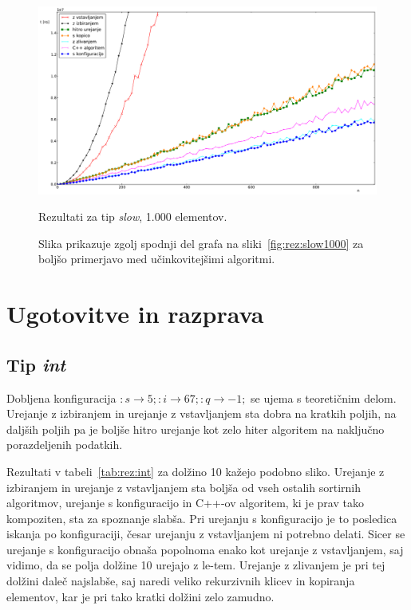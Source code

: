 \documentclass[a4paper,oneside,12pt]{article}
\newcommand{\lra}{\ensuremath{\longrightarrow}}
\begin{document}
\begin{figure}[h!]
    \includegraphics[width=\textwidth]{slike/slow1000zoom.pdf}
    \vspace{-0.7cm}
    \caption[Rezultati za tip \emph{slow}, 1.000 el. -- izrez]{Rezultati za tip
    \emph{slow}, 1.000 elementov.}
    \caption*{{\small Slika
    prikazuje zgolj spodnji del grafa na sliki~\ref{fig:rez:slow1000} za
    boljšo primerjavo med učinkovitejšimi algoritmi.}}
    \label{fig:rez:slowblizu}
\end{figure}

\pagebreak
\mbox{}

\pagebreak

\section{Ugotovitve in razprava}
\subsection{Tip \emph{int}}
Dobljena konfiguracija $:s \lra 5;:i \lra 67;:q \lra -1;$
se ujema s teoretičnim delom. Urejanje z izbiranjem in urejanje z vstavljanjem sta 
dobra na kratkih poljih, na daljših poljih pa je boljše hitro urejanje kot zelo hiter algoritem na naključno
porazdeljenih podatkih. 

Rezultati v tabeli~\ref{tab:rez:int} za dolžino 10 kažejo podobno sliko. Urejanje z izbiranjem in urejanje 
z vstavljanjem sta boljša od vseh ostalih sortirnih algoritmov, urejanje s konfiguracijo in \mbox{C++-ov} 
algoritem, ki je prav tako kompoziten, sta za spoznanje slabša. Pri urejanju s konfiguracijo je to posledica
iskanja po konfiguraciji, česar urejanju z vstavljanjem ni potrebno delati. Sicer 
se urejanje s konfiguracijo obnaša popolnoma enako kot urejanje z vstavljanjem, saj vidimo, da se polja dolžine 
10 urejajo z le-tem. Urejanje z zlivanjem je pri tej dolžini daleč najslabše, saj naredi veliko 
rekurzivnih klicev in kopiranja elementov, kar je pri tako kratki dolžini zelo zamudno.
\end{document}
